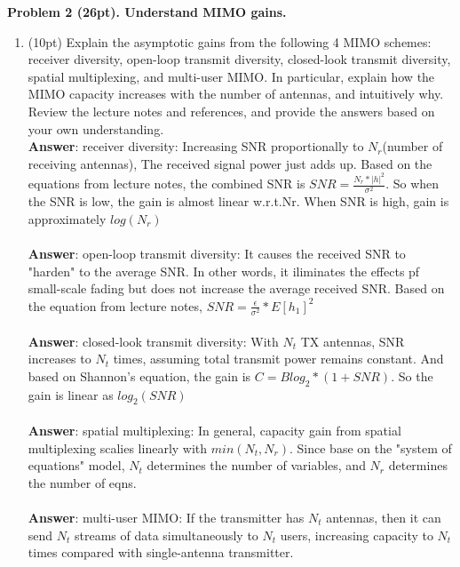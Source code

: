 \documentclass[12pt]{article}
\begin{document}
		
\noindent \textbf{Problem 2 (26pt). Understand MIMO gains.\\}
\begin{enumerate}
\item  (10pt) Explain the asymptotic gains from the following 4 MIMO schemes: receiver diversity,
open-loop transmit diversity, closed-look transmit diversity, spatial multiplexing, and multi-user
MIMO. In particular, explain how the MIMO capacity increases with the number of antennas,
and intuitively why. Review the lecture notes and references, and provide the answers based on
your own understanding.\\
\textbf{Answer}: receiver diversity: Increasing SNR proportionally to $N_r$(number of receiving antennas), The received signal power just adds up. Based on the equations from lecture notes, the combined SNR is $SNR = \frac{N_r * |h|^{2}}{\sigma^{2}}$. So when the SNR is low, the gain is almost linear w.r.t.Nr. When SNR is high, gain is approximately $log(N_r)$\\\\
\textbf{Answer}: open-loop transmit diversity: It causes the received SNR to "harden" to the average SNR. In other words, it iliminates the effects pf small-scale fading but does not increase the average received SNR. Based on the equation from lecture notes, $SNR = \frac{\epsilon}{\sigma^{2}} * E[h_1]^{2}$\\\\
\textbf{Answer}: closed-look transmit diversity: With $N_t$ TX antennas, SNR increases to $N_t$ times, assuming total transmit power remains constant. And based on Shannon's equation, the gain is $C = Blog_2*(1+SNR)$. So the gain is linear as $log_2(SNR)$\\\\
\textbf{Answer}: spatial multiplexing: In general, capacity gain from spatial multiplexing scalies linearly with $min(N_t, N_r)$. Since base on the "system of equations" model, $N_t$ determines the number of variables, and $N_r$ determines the number of eqns.\\\\
\textbf{Answer}: multi-user MIMO: If the transmitter has $N_t$ antennas, then it can send $N_t$ streams of data simultaneously to $N_t$ users, increasing capacity to $N_t$ times compared with single-antenna transmitter.\\\\


\end{enumerate}
\end{document}
